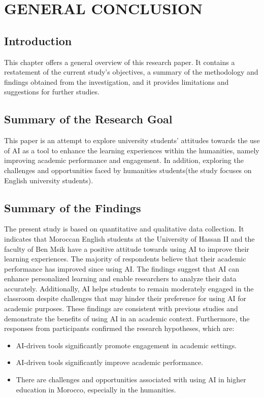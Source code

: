 \chapter{GENERAL CONCLUSION}
\section{Introduction}

This chapter offers a general overview of this research paper.
It contains a restatement of the current study’s objectives, a summary
of the methodology and findings obtained from the investigation, and 
it provides limitations and suggestions for further studies.

\section{Summary of the Research Goal}

This paper is an attempt to explore university students’ attitudes towards the 
use of AI as a tool to enhance the learning experiences within the humanities, 
namely improving academic performance and engagement. In addition, exploring the
challenges and opportunities faced by humanities students(the study focuses on English university students).

\section{Summary of the Findings}


The present study is based on quantitative and qualitative data collection. 
It indicates that Moroccan English students at the University of Hassan II and the faculty of Ben Msik have
a positive attitude towards using AI to improve their learning experiences. 
The majority of respondents believe that their academic performance has improved since using AI.
The findings suggest that AI can enhance personalized learning and enable researchers to analyze their data accurately. 
Additionally, AI helps students to remain moderately engaged in the classroom
despite challenges that may hinder their preference for using AI for academic purposes. 
These findings are consistent with previous studies and demonstrate the benefits of using AI in an academic context. 
Furthermore, the responses from participants confirmed the research hypotheses, which are:
\begin{itemize}
	
\item AI-driven tools significantly promote engagement in academic settings.
\item AI-driven tools significantly improve academic performance.
\item There are challenges and opportunities associated with using AI in higher education in Morocco, especially in the humanities.
\end{itemize}
